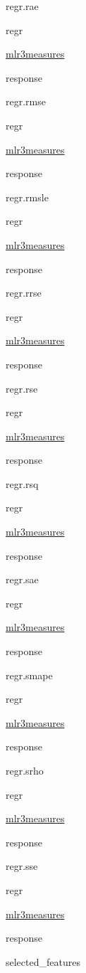 \documentclass[]{article}
\begin{document}
regr.rae

regr

\href{https://cran.r-project.org/package=mlr3measures}{mlr3measures}

response

regr.rmse

regr

\href{https://cran.r-project.org/package=mlr3measures}{mlr3measures}

response

regr.rmsle

regr

\href{https://cran.r-project.org/package=mlr3measures}{mlr3measures}

response

regr.rrse

regr

\href{https://cran.r-project.org/package=mlr3measures}{mlr3measures}

response

regr.rse

regr

\href{https://cran.r-project.org/package=mlr3measures}{mlr3measures}

response

regr.rsq

regr

\href{https://cran.r-project.org/package=mlr3measures}{mlr3measures}

response

regr.sae

regr

\href{https://cran.r-project.org/package=mlr3measures}{mlr3measures}

response

regr.smape

regr

\href{https://cran.r-project.org/package=mlr3measures}{mlr3measures}

response

regr.srho

regr

\href{https://cran.r-project.org/package=mlr3measures}{mlr3measures}

response

regr.sse

regr

\href{https://cran.r-project.org/package=mlr3measures}{mlr3measures}

response

selected\_features
\end{document}
